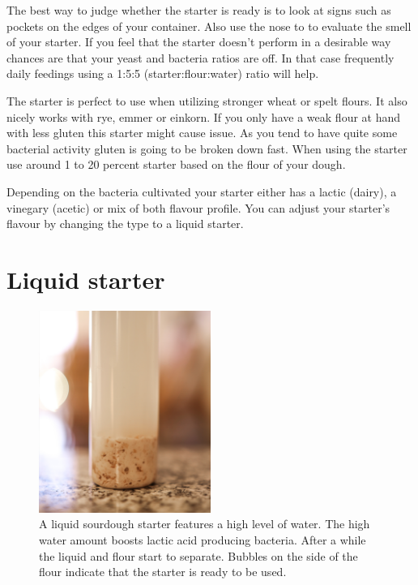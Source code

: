 The best way to judge whether the starter is ready is to look at signs such as
pockets on the edges of your container. Also use the nose to to evaluate the
smell of your starter. If you feel that the starter doesn't perform in a
desirable way chances are that your yeast and bacteria ratios are off. In that
case frequently daily feedings using a 1:5:5 (starter:flour:water) ratio will
help.

The starter is perfect to use when utilizing stronger wheat or spelt flours.
It also nicely works with rye, emmer or einkorn. If you only have a weak flour
at hand with less gluten this starter might cause issue. As you tend to have
quite some bacterial activity gluten is going to be broken down fast. When
using the starter use around 1 to 20 percent starter based on the flour of your
dough.

Depending on the bacteria cultivated your starter either has a lactic (dairy),
a vinegary (acetic) or mix of both flavour profile. You can adjust your
starter's flavour by changing the type to a liquid starter.

\section{Liquid starter}
\label{section:liquid-starter}

\begin{figure}[!htb]
  \centering
  \includegraphics[width=0.5\textwidth]{sourdough-starter-liquid.jpg}
  \caption{A liquid sourdough starter features a high level of water. The high
  water amount boosts lactic acid producing bacteria. After a while the liquid
  and flour start to separate. Bubbles on the side of the flour
  indicate that the starter is ready to be used.}
  \label{fig:liquid-sourdough-starter}
\end{figure}


